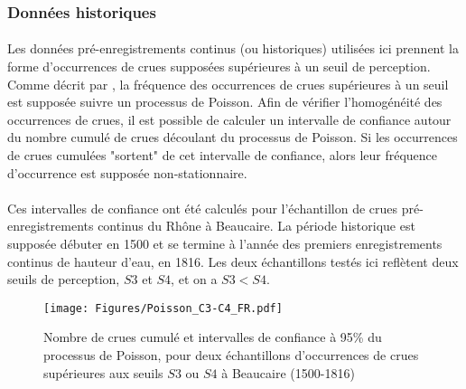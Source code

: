 \documentclass[11pt]{article}
\begin{document}

		
	\subsubsection{Données historiques}
	
	\paragraph{} Les données pré-enregistrements continus (ou historiques) utilisées ici prennent la forme d'occurrences de crues supposées supérieures à un seuil de perception. Comme décrit par \citet{lang_towards_1999}, la fréquence des occurrences de crues supérieures à un seuil est supposée suivre un processus de Poisson. Afin de vérifier l'homogénéité des occurrences de crues, il est possible de calculer un intervalle de confiance autour du nombre cumulé de crues découlant du processus de Poisson. Si les occurrences de crues cumulées "sortent" de cet intervalle de confiance, alors leur fréquence d'occurrence est supposée non-stationnaire. 
	
	\paragraph{} Ces intervalles de confiance ont été calculés pour l'échantillon de crues pré-enregistrements continus du Rhône à Beaucaire. La période historique est supposée débuter en 1500 et se termine à l'année des premiers enregistrements continus de hauteur d'eau, en 1816. Les deux échantillons testés ici reflètent deux seuils de perception, $S3$ et $S4$, et on a $S3 < S4$. 

	\begin{figure}[h]
		\centering
		\texttt{[image: Figures/Poisson\_C3-C4\_FR.pdf]}	
		\caption{Nombre de crues cumulé et intervalles de confiance à 95\% du processus de 						Poisson, pour deux échantillons d'occurrences de crues supérieures aux seuils $S3$ ou $S4$ à Beaucaire 							(1500-1816)}
		\label{fig:Poisson_C3-C4}
	\end{figure}		
	
\end{document}
